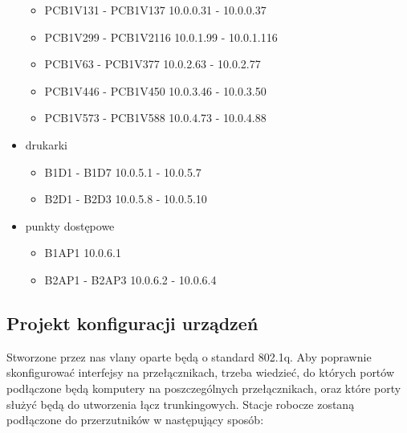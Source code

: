 \documentclass[a4paper, 12pt]{article}
\begin{document}
\begin{itemize}
	\begin{itemize}
	\item PCB1V131 - PCB1V137 10.0.0.31 - 10.0.0.37
	\item PCB1V299 - PCB1V2116 10.0.1.99 - 10.0.1.116
	\item PCB1V63 - PCB1V377 10.0.2.63 - 10.0.2.77
	\item PCB1V446 - PCB1V450 10.0.3.46 - 10.0.3.50
	\item PCB1V573 - PCB1V588 10.0.4.73 - 10.0.4.88
	\end{itemize}
\item drukarki
	\begin{itemize}
	\item B1D1 - B1D7 10.0.5.1 - 10.0.5.7
	\item B2D1 - B2D3 10.0.5.8 - 10.0.5.10
	\end{itemize}
\item punkty dostępowe
	\begin{itemize}
	\item B1AP1 10.0.6.1
	\item B2AP1 - B2AP3 10.0.6.2 - 10.0.6.4 
	\end{itemize}
\end{itemize}

\subsection{Projekt konfiguracji urządzeń}
Stworzone przez nas vlany oparte będą o standard 802.1q. Aby poprawnie skonfigurować interfejsy na przełącznikach, trzeba wiedzieć, do których portów podłączone będą komputery na poszczególnych przełącznikach, oraz które porty służyć będą do utworzenia łącz trunkingowych. Stacje robocze zostaną podłączone do przerzutników w następujący sposób:
\end{document}
